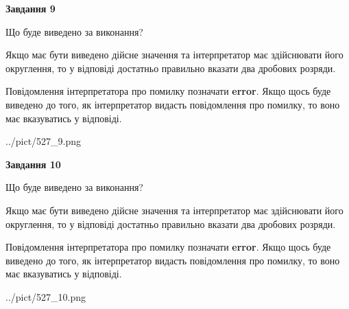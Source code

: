 \documentclass[12pt, ukrainian]{article}
\begin{document}
{\begin {Large}
{\begin {center}\textbf{Завдання 9}\end {center}}\par
Що буде виведено за виконання? \par

Якщо має бути виведено дійсне значення та інтерпретатор має здійснювати його округлення, 
то у відповіді достатньо правильно вказати два дробових розряди.

Повідомлення інтерпретатора про помилку позначати \textbf{error}.
Якщо щось буде виведено до того, як інтерпретатор видасть повідомлення про помилку, 
то воно має вказуватись у відповіді. \par

\begin{center}
	{../pict/527_9.png}
\end{center}
\newpage

{\begin {center}\textbf{Завдання 10}\end {center}}\par
Що буде виведено за виконання? \par

Якщо має бути виведено дійсне значення та інтерпретатор має здійснювати його округлення, 
то у відповіді достатньо правильно вказати два дробових розряди.

Повідомлення інтерпретатора про помилку позначати \textbf{error}.
Якщо щось буде виведено до того, як інтерпретатор видасть повідомлення про помилку, 
то воно має вказуватись у відповіді. \par

\begin{center}
	{../pict/527_10.png}
\end{center}
\newpage

\end {Large}}
\end{document}
